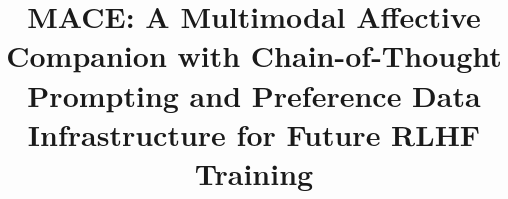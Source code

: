 \documentclass[sigconf, review=true]{acmart}
\begin{document}
\title[MACE: A Multimodal Affective Companion]{MACE: A Multimodal
Affective Companion with Chain-of-Thought Prompting and Preference
Data Infrastructure for Future RLHF Training}

%
%

\renewcommand{\shortauthors}{}
\end{document}

